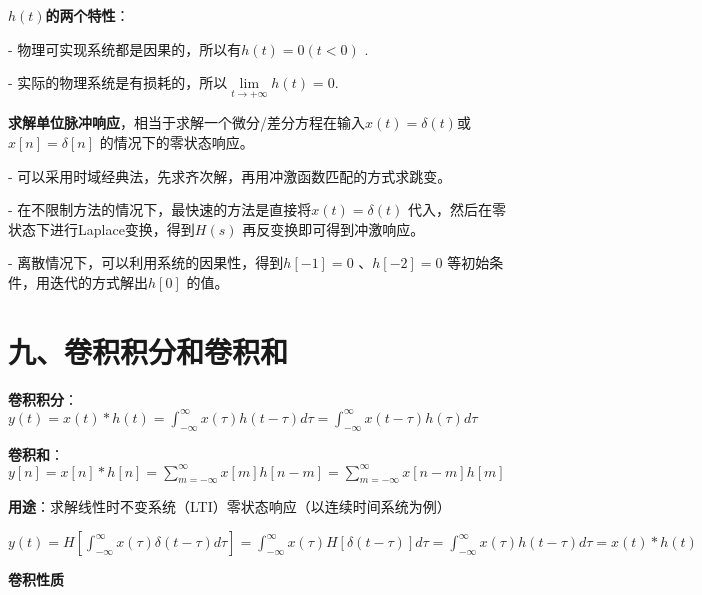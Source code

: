 $h(t)$\textbf{的两个特性}：

- 物理可实现系统都是因果的，所以有$h(t)=0(t<0)$ .

- 实际的物理系统是有损耗的，所以$\lim \limits_{t\to+\infty}h(t)=0$.

\textbf{求解单位脉冲响应}，相当于求解一个微分/差分方程在输入$x(t)=\delta(t)$或$x[n]=\delta[n]$ 的情况下的零状态响应。

- 可以采用时域经典法，先求齐次解，再用冲激函数匹配的方式求跳变。

- 在不限制方法的情况下，最快速的方法是直接将$x(t)=\delta(t)$ 代入，然后在零状态下进行Laplace变换，得到$H(s)$ 再反变换即可得到冲激响应。

- 离散情况下，可以利用系统的因果性，得到$h[-1]=0$ 、$h[-2]=0$ 等初始条件，用迭代的方式解出$h[0]$ 的值。

\section*{九、卷积积分和卷积和}

\textbf{卷积积分}：$y(t)=x(t)\ast h(t)=\int ^\infty _{-\infty}x(\tau)h(t-\tau)d\tau=\int ^\infty _{-\infty}x(t-\tau)h(\tau)d\tau$

\textbf{卷积和}：$y[n]=x[n]*h[n]=\sum^\infty_{m=-\infty}x[m]h[n-m]=\sum^\infty_{m=-\infty}x[n-m]h[m]$

\textbf{用途}：求解线性时不变系统（LTI）零状态响应（以连续时间系统为例）

$y(t)=H[\int^\infty_{-\infty}x(\tau)\delta(t-\tau)d\tau]=\int^\infty_{-\infty}x(\tau)H[\delta(t-\tau)]d\tau=\int^\infty_{-\infty}x(\tau)h(t-\tau)d\tau=x(t)*h(t)$

\textbf{卷积性质}

